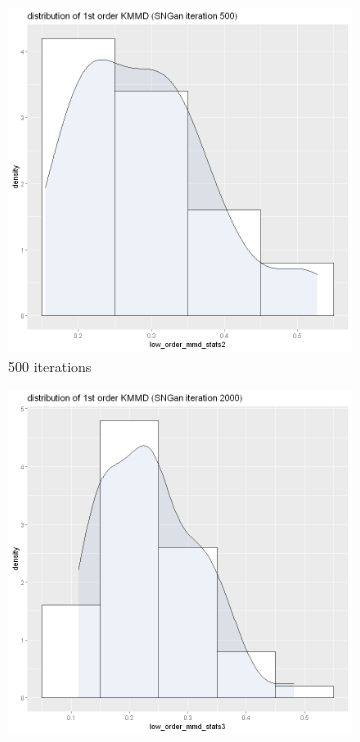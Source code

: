\documentclass{article}
\begin{document}
\begin{figure}[h!]
    \caption{Dataset Anime}
     \centering
     \begin{subfigure}[b]{0.3\textwidth}
         \centering
         \includegraphics[width=\textwidth]{kmmd_figures/sngan_anime_lowdist_500.png}
         \caption{500 iterations}
     \end{subfigure}
     \hfill
     \begin{subfigure}[b]{0.3\textwidth}
         \centering
         \includegraphics[width=\textwidth]{kmmd_figures/sngan_anime_lowdist_2000.png}

\end{subfigure}
\end{figure}
\end{document}
